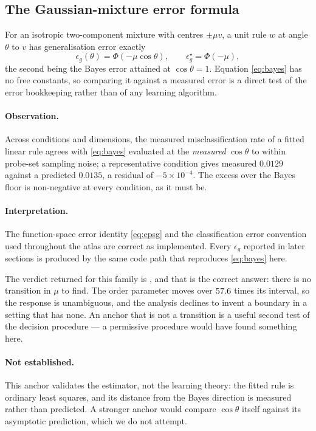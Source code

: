 \subsection{The Gaussian-mixture error formula}

For an isotropic two-component mixture with centres $\pm\mu v$, a unit rule $w$
at angle $\theta$ to $v$ has generalisation error exactly
\begin{equation}
  \epsilon_g(\theta)=\Phi\!\left(-\mu\cos\theta\right),
  \qquad
  \epsilon_g^{\star}=\Phi(-\mu),
  \label{eq:bayes}
\end{equation}
the second being the Bayes error attained at $\cos\theta=1$. Equation
\eqref{eq:bayes} has no free constants, so comparing it against a measured
error is a direct test of the error bookkeeping rather than of any learning
algorithm.

\paragraph{Observation.}
Across \AtlasMixtureBayesConditions{} conditions and
\AtlasMixtureBayesSizes{} dimensions, the measured misclassification rate of a
fitted linear rule agrees with \eqref{eq:bayes} evaluated at the
\emph{measured} $\cos\theta$ to within probe-set sampling noise; a
representative condition gives measured $0.0129$ against a predicted $0.0135$,
a residual of $-5\times10^{-4}$. The excess over the Bayes floor is
non-negative at every condition, as it must be.

\paragraph{Interpretation.}
The function-space error identity \eqref{eq:epsg} and the classification error
convention used throughout the atlas are correct as implemented. Every
$\epsilon_g$ reported in later sections is produced by the same code path that
reproduces \eqref{eq:bayes} here.

The verdict returned for this family is
\emph{\AtlasMixtureBayesVerdict{}}, and that is the correct answer: there is no
transition in $\mu$ to find. The order parameter moves over
$57.6{}$ times its interval, so the response is
unambiguous, and the analysis declines to invent a boundary in a setting that
has none. An anchor that is not a transition is a useful second test of the
decision procedure --- a permissive procedure would have found something here.

\paragraph{Not established.}
This anchor validates the estimator, not the learning theory: the fitted rule
is ordinary least squares, and its distance from the Bayes direction is
measured rather than predicted. A stronger anchor would compare $\cos\theta$
itself against its asymptotic prediction, which we do not attempt.

